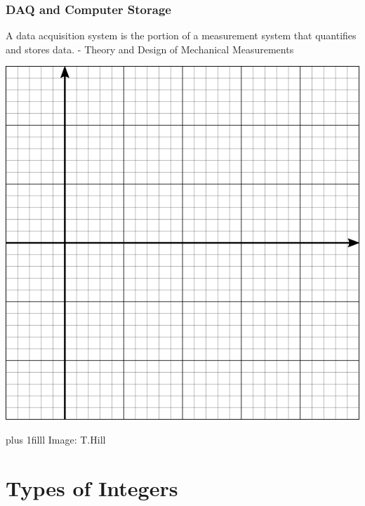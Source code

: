 \documentclass[fleqn]{beamer} %
\newcommand{\sectiontitleI}{DAQ and Computer Storage}
\newcommand{\sectiontitleII}{Types of Integers}
\newcommand{\btVFill}{\vskip0pt plus 1filll}
\begin{document}
	\begin{frame}[label=sectionI] \small
		\frametitle{\sectiontitleI}

		
		A data acquisition system is the portion of a measurement system that quantifies and stores data. - {\tiny Theory and Design of Mechanical Measurements}

		\begin{multicols}{2}
		\includegraphics[scale=.30]{cartesian_6x6_B.png} 
		

		\end{multicols}
		\btVFill
		\tiny{Image: T.Hill}
	\end{frame}
	
\section{\sectiontitleII}	
\end{document}
